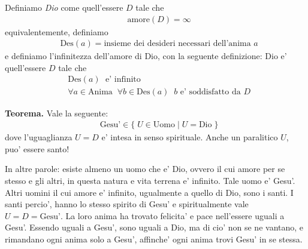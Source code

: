 \begin{vcentered}
    
    Definiamo \emph{Dio} come quell'essere $D$ tale che 
    \begin{align*}
        &\textrm{amore}(D) = \infty
    \end{align*}
    equivalentemente, definiamo
    \begin{align*}
        &\textrm{Des}(a) = \textrm{insieme dei desideri necessari dell'anima } a
    \end{align*}
    e definiamo l'infinitezza dell'amore di Dio, con la seguente definizione: Dio e' quell'essere $D$ tale che
    \begin{align*}
        &\textrm{Des}(a)\;\textrm{ e' infinito }\\
        &\forall a \in \textrm{Anima}\;\;\forall b \in \textrm{Des}(a)\;\;b \textrm{ e' soddisfatto da }D
    \end{align*}

    \textbf{Teorema.} Vale la seguente:
    \begin{align*}
        &\textrm{Gesu'}\in \{ \;U\in\textrm{Uomo}\;|\;U=\textrm{Dio}\;\}
    \end{align*}
    dove l'uguaglianza $U=D$ e' intesa in senso spirituale. Anche un paralitico $U$, puo' essere santo!

    In altre parole: esiste almeno un uomo che e' Dio, ovvero il cui amore per se stesso e gli altri, in questa natura e vita terrena e' infinito. Tale uomo e' Gesu'. Altri uomini il cui amore e' infinito, ugualmente a quello di Dio, sono i santi. I santi percio', hanno lo stesso spirito di Gesu' e spiritualmente vale $U=D=\textrm{Gesu'}$. La loro anima ha trovato felicita' e pace nell'essere uguali a Gesu'. Essendo uguali a Gesu', sono uguali a Dio, ma di cio' non se ne vantano, e rimandano ogni anima solo a Gesu', affinche' ogni anima trovi Gesu' in se stessa.

\end{vcentered}
